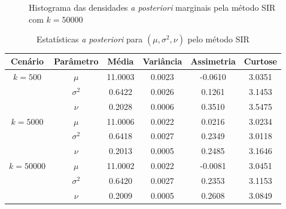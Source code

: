 \documentclass[9pt]{beamer}
\begin{document}
\begin{frame}
\begin{figure}[t]
	\caption{Histograma das densidades \textit{a posteriori} marginais pela método SIR com $k = 50000$}%
\end{figure}
\end{frame}
\begin{frame}
\begin{table}[htb]
	\caption{Estatísticas \textit{a posteriori} para $(\mu, \sigma^2, \nu)$ pelo método SIR}
	\label{tab2}
	\centering
	\begin{tabular}{cccccc}
		\toprule
		Cenário & Parâmetro & Média & Variância & Assimetria & Curtose \\
		\midrule
		$k = 500$ & $\mu$      & 11.0003 & 0.0023 & -0.0610 & 3.0351 \\
		& $\sigma^2$ &  0.6422 & 0.0026 &  0.1261 & 3.1453 \\
		& $\nu$      &  0.2028 & 0.0006 &  0.3510 & 3.5475 \\
		\midrule
		$k = 5000$ & $\mu$      & 11.0006 & 0.0022 &  0.0216 & 3.0234 \\
		& $\sigma^2$ &  0.6418 & 0.0027 &  0.2349 & 3.0118 \\
		& $\nu$      &  0.2013 & 0.0005 &  0.2485 & 3.1646 \\
		\midrule
		$k = 50000$ & $\mu$      & 11.0002 & 0.0022 & -0.0081 & 3.0451 \\
		& $\sigma^2$ &  0.6420 & 0.0027 &  0.2353 & 3.1153 \\
		& $\nu$      &  0.2009 & 0.0005 &  0.2608 & 3.0849 \\
		\bottomrule
	\end{tabular}
\end{table}
\end{frame}
\end{document}
